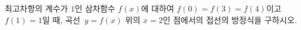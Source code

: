 최고차항의 계수가 $1$인 삼차함수 $f(x)$에 대하여 $f(0)=f(3)=f(4)$이고 $f(1)=1$일 때, 곡선~$y=f(x)$ 위의 $x=2$인 점에서의 접선의 방정식을 구하시오.
